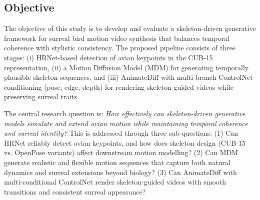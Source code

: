 \documentclass[final-report]{report-template}
\begin{document}




\subsection{Objective}
The objective of this study is to develop and evaluate a skeleton-driven generative framework for surreal bird motion video synthesis that balances temporal coherence with stylistic consistency. The proposed pipeline consists of three stages: (i) HRNet-based detection of avian keypoints in the CUB-15 representation, (ii) a Motion Diffusion Model (MDM) for generating temporally plausible skeleton sequences, and (iii) AnimateDiff with multi-branch ControlNet conditioning (pose, edge, depth) for rendering skeleton-guided videos while preserving surreal traits.  

The central research question is: \textit{How effectively can skeleton-driven generative models simulate and extend avian motion while maintaining temporal coherence and surreal identity?} This is addressed through three sub-questions: (1) Can HRNet reliably detect avian keypoints, and how does skeleton design (CUB-15 vs. OpenPose variants) affect downstream motion modelling? (2) Can MDM generate realistic and flexible motion sequences that capture both natural dynamics and surreal extensions beyond biology? (3) Can AnimateDiff with multi-conditional ControlNet render skeleton-guided videos with smooth transitions and consistent surreal appearance?  
\end{document}
